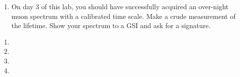 \documentclass{../signatures}
\begin{document}
\prelabsignatures

\midlab

\begin{enumerate}

    \item On day 3 of this lab, you should have successfully acquired an over-night muon spectrum with a calibrated time scale. Make a crude measurement of the lifetime. Show your spectrum to a GSI and ask for a signature.
\\[36pt]
\end{enumerate}


\checkpointsection 

\begin{enumerate}

\item {}

\item {}

\item {}

\item {}

\end{enumerate}
\end{document}
